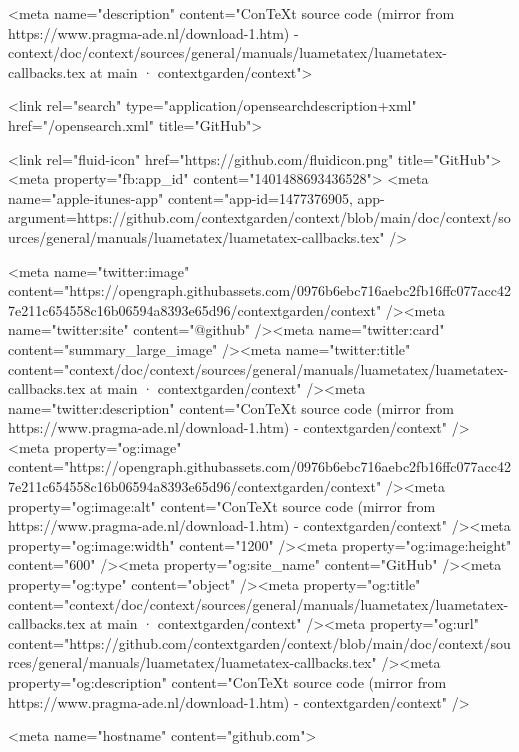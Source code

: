     

      <meta name="description" content="ConTeXt source code (mirror from https://www.pragma-ade.nl/download-1.htm) - context/doc/context/sources/general/manuals/luametatex/luametatex-callbacks.tex at main · contextgarden/context">

      <link rel="search" type="application/opensearchdescription+xml" href="/opensearch.xml" title="GitHub">

    <link rel="fluid-icon" href="https://github.com/fluidicon.png" title="GitHub">
    <meta property="fb:app_id" content="1401488693436528">
    <meta name="apple-itunes-app" content="app-id=1477376905, app-argument=https://github.com/contextgarden/context/blob/main/doc/context/sources/general/manuals/luametatex/luametatex-callbacks.tex" />

      <meta name="twitter:image" content="https://opengraph.githubassets.com/0976b6ebc716aebc2fb16ffc077acc427e211c654558c16b06594a8393e65d96/contextgarden/context" /><meta name="twitter:site" content="@github" /><meta name="twitter:card" content="summary_large_image" /><meta name="twitter:title" content="context/doc/context/sources/general/manuals/luametatex/luametatex-callbacks.tex at main · contextgarden/context" /><meta name="twitter:description" content="ConTeXt source code (mirror from https://www.pragma-ade.nl/download-1.htm) - contextgarden/context" />
  <meta property="og:image" content="https://opengraph.githubassets.com/0976b6ebc716aebc2fb16ffc077acc427e211c654558c16b06594a8393e65d96/contextgarden/context" /><meta property="og:image:alt" content="ConTeXt source code (mirror from https://www.pragma-ade.nl/download-1.htm) - contextgarden/context" /><meta property="og:image:width" content="1200" /><meta property="og:image:height" content="600" /><meta property="og:site_name" content="GitHub" /><meta property="og:type" content="object" /><meta property="og:title" content="context/doc/context/sources/general/manuals/luametatex/luametatex-callbacks.tex at main · contextgarden/context" /><meta property="og:url" content="https://github.com/contextgarden/context/blob/main/doc/context/sources/general/manuals/luametatex/luametatex-callbacks.tex" /><meta property="og:description" content="ConTeXt source code (mirror from https://www.pragma-ade.nl/download-1.htm) - contextgarden/context" />
  




      <meta name="hostname" content="github.com">



